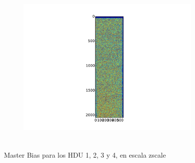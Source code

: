 \documentclass[a4paper, 11pt, spanish]{article}
\begin{document}
\begin{figure}[!ht]
\begin{subfigure}{.5\textwidth}
  \caption{}
  \label{fig:bias3}
\end{subfigure}%
\begin{subfigure}{.5\textwidth}
  \centering
  \includegraphics[width=10cm, height=8cm]{img/bias 4.pdf}
  \caption{}
  \label{fig:bias4}
\end{subfigure}
\caption{Master Bias para los HDU 1, 2, 3 y 4, en escala zscale}
\label{fig:bias}
\end{figure}
\end{document}
